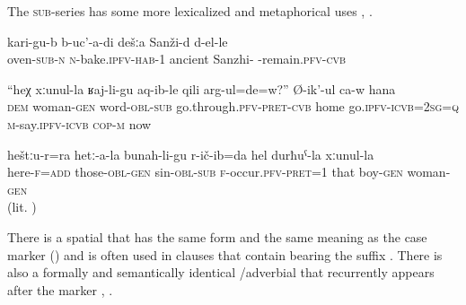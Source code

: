 The \textsc{sub}-series has some more lexicalized  and metaphorical uses , .
%
\begin{exe} 
	\ex	\label{In ancient times when we were in Sanzhi we baked (bread) in the community oven}
	\gll	kari-gu-b	b-uc'-a-di	dešːa	Sanži-d	d-el-le\\
		oven-\textsc{sub}-\textsc{n}	\textsc{n}-bake.\textsc{ipfv}-\textsc{hab}-1	ancient	Sanzhi-\tsc{1/2pl}	-remain.\textsc{pfv}-\textsc{cvb}\\
	\glt	{}
	
	\ex	\label{he says, You go home following the words of your wife, yes}
	\gll	``heχ	xːunul-la ʁaj-li-gu	aq-ib-le	qili	arg-ul=de=w?''	Ø-ik'-ul ca-w	hana \\
		\textsc{dem}	woman-\textsc{gen}	word-\textsc{obl}-\textsc{sub}	go.through.\textsc{pfv}-\textsc{pret}-\textsc{cvb}	home	go.\textsc{ipfv}-\textsc{icvb}=2\textsc{sg}=\textsc{q}	\textsc{m}-say.\textsc{ipfv}-\textsc{icvb} \textsc{cop-m}	now\\
	\glt	{}
	
	\ex	\label{Here also (i.e. in this case) I am guilty in front of my daughter-in-law}
	\gll	heštːu-r=ra	hetː-a-la	bunah-li-gu	r-ič-ib=da	hel	durħuˁ-la	xːunul-la \\
		here-\textsc{f}=\textsc{add}	those-\textsc{obl}-\textsc{gen}	sin-\textsc{obl}-\textsc{sub}	\textsc{f}-occur.\textsc{pfv}-\textsc{pret}=1	that	boy-\textsc{gen}	woman-\textsc{gen}\\
	\glt	{} (lit. )
\end{exe}

There is a spatial  that has the same form and the same meaning as the case marker () and is often used in clauses that contain  bearing the  suffix . There is also a formally and semantically identical \slash adverbial that recurrently appears after the  marker , .
	

